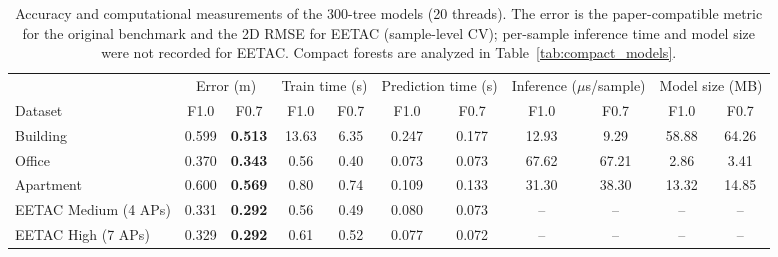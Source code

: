 \begin{table}[!t]
\centering
\caption{Accuracy and computational measurements of the 300-tree models (20 threads). The error is the paper-compatible metric for the original benchmark and the 2D RMSE for EETAC (sample-level CV); per-sample inference time and model size were not recorded for EETAC. Compact forests are analyzed in Table~\ref{tab:compact_models}.}
\label{tab:efficiency}
\footnotesize
\setlength{\tabcolsep}{4.5pt}
\begin{tabular}{lcccccccccc}
\toprule
 & \multicolumn{2}{c}{Error (m)} & \multicolumn{2}{c}{Train time (s)} & \multicolumn{2}{c}{Prediction time (s)} & \multicolumn{2}{c}{Inference ($\mu$s/sample)} & \multicolumn{2}{c}{Model size (MB)} \\
\cmidrule(lr){2-3}\cmidrule(lr){4-5}\cmidrule(lr){6-7}\cmidrule(lr){8-9}\cmidrule(lr){10-11}
Dataset & F1.0 & F0.7 & F1.0 & F0.7 & F1.0 & F0.7 & F1.0 & F0.7 & F1.0 & F0.7 \\
\midrule
Building & 0.599 & \textbf{0.513} & 13.63 & 6.35 & 0.247 & 0.177 & 12.93 & 9.29 & 58.88 & 64.26 \\
Office & 0.370 & \textbf{0.343} & 0.56 & 0.40 & 0.073 & 0.073 & 67.62 & 67.21 & 2.86 & 3.41 \\
Apartment & 0.600 & \textbf{0.569} & 0.80 & 0.74 & 0.109 & 0.133 & 31.30 & 38.30 & 13.32 & 14.85 \\
EETAC Medium (4 APs) & 0.331 & \textbf{0.292} & 0.56 & 0.49 & 0.080 & 0.073 & -- & -- & -- & -- \\
EETAC High (7 APs) & 0.329 & \textbf{0.292} & 0.61 & 0.52 & 0.077 & 0.072 & -- & -- & -- & -- \\
\bottomrule
\end{tabular}
\end{table}
